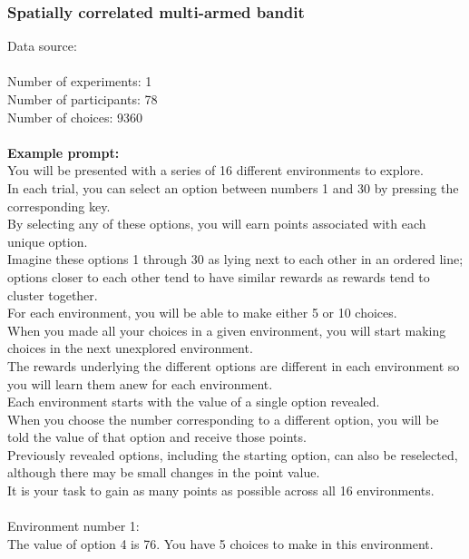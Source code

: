 \documentclass[pdflatex,sn-nature]{sn-jnl}%
\theoremstyle{thmstyleone}%
\theoremstyle{thmstyletwo}%
\theoremstyle{thmstylethree}%
\begin{document}
\subsubsection*{Spatially correlated multi-armed bandit}
Data source: \cite{wu2018generalization}  \\ $~$ \\
Number of experiments: 1 $~$\\ 
Number of participants: 78 $~$\\ 
Number of choices: 9360 $~$\\ 
 $~$\\ 
\textbf{Example prompt:}
 $~$\\ 
You will be presented with a series of 16 different environments to explore. $~$\\ 
In each trial, you can select an option between numbers 1 and 30 by pressing the corresponding key. $~$\\ 
By selecting any of these options, you will earn points associated with each unique option. $~$\\ 
Imagine these options 1 through 30 as lying next to each other in an ordered line; options closer to each other tend to have similar rewards as rewards tend to cluster together. $~$\\ 
For each environment, you will be able to make either 5 or 10 choices. $~$\\ 
When you made all your choices in a given environment, you will start making choices in the next unexplored environment. $~$\\ 
The rewards underlying the different options are different in each environment so you will learn them anew for each environment. $~$\\ 
Each environment starts with the value of a single option revealed. $~$\\ 
When you choose the number corresponding to a different option, you will be told the value of that option and receive those points. $~$\\ 
Previously revealed options, including the starting option, can also be reselected, although there may be small changes in the point value. $~$\\ 
It is your task to gain as many points as possible across all 16 environments. $~$\\ 
 $~$\\ 
Environment number 1: $~$\\ 
The value of option 4 is 76. You have 5 choices to make in this environment. $~$\\ 
\end{document}
